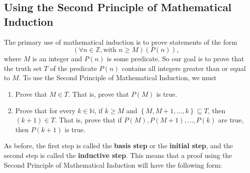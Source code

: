 \subsection*{Using the Second Principle of Mathematical Induction}
The primary use of mathematical induction is to prove statements of the form
\[
\left( {\forall n \in \mathbb{Z},\text{with }n \geq M} \right)\left( {P( n )} \right),
\]
where  $M$  is an integer and  $P( n )$ is some predicate. So our goal is to prove that the truth set  $T$  of the predicate   $P( n )$ contains all integers greater than or equal to  $M$.  To use the Second Principle of Mathematical Induction, we must

\begin{enumerate}
\item Prove that  $M \in T$\!.  That is, prove that  $P( M )$ is true.

\item Prove that for every  $k \in \mathbb{N}$, if  $k \geq M$ and  
$\left\{ {M,M + 1, \ldots ,k} \right\} \subseteq T$\!, then  $\left( {k + 1} \right) \in T$\!.  That is, prove that if  $P( M ),P( {M + 1} ), \ldots ,P( k )$ are true, then  $P( {k + 1} )$ is true.
\end{enumerate}

As before, the first step is called the \textbf{basis step}
%
%
 or the \textbf{initial step}, and the second step is called the \textbf{inductive step}.
%
%
  This means that a proof using the Second Principle of Mathematical Induction will have the following form:
%
\begin{flushleft}
\end{flushleft}

